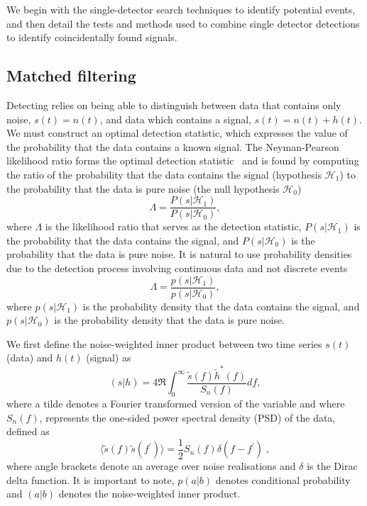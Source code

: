 We begin with the single-detector search techniques to identify potential \gwadj events, and then detail the tests and methods used to combine single detector detections to identify coincidentally found \gwadj signals.

\subsection{\label{2:sec:matched-filter}Matched filtering}

Detecting \gws relies on being able to distinguish between data that contains only noise, \( s(t) = n(t) \), and data which contains a \gwadj signal, \( s(t) = n(t) + h(t) \). We must construct an optimal detection statistic, which expresses the value of the probability that the data contains a known signal. The Neyman-Pearson likelihood ratio forms the optimal detection statistic~\cite{Biswas:2012} and is found by computing the ratio of the probability that the data contains the signal (hypothesis $\mathcal{H}_{1}$) to the probability that the data is pure noise (the null hypothesis $\mathcal{H}_{0}$)
%
\begin{equation}
    \Lambda = \frac{P(s|\mathcal{H}_{1})}{P(s|\mathcal{H}_{0})},
\end{equation}
%
where \( \Lambda \) is the likelihood ratio that serves as the detection statistic, \( P(s|\mathcal{H}_{1}) \) is the probability that the data contains the signal, and \( P(s|\mathcal{H}_{0}) \) is the probability that the data is pure noise. It is natural to use probability densities due to the detection process involving continuous data and not discrete events
%
\begin{equation}
    \Lambda = \frac{p(s|\mathcal{H}_{1})}{p(s|\mathcal{H}_{0})},
    \label{2:eq:likelihood_ratio}
\end{equation}
%
where \( p(s|\mathcal{H}_{1}) \) is the probability density that the data contains the signal, and \( p(s|\mathcal{H}_{0}) \) is the probability density that the data is pure noise.

We first define the noise-weighted inner product between two time series $s(t)$ (data) and $h(t)$ (signal) as~\cite{PyCBC:2016}
%
\begin{equation}
  (s | h) = 4 \Re \int^{\infty}_{0} \frac{\tilde{s}(f) \tilde{h}^*(f)}{S_n(f)} df,
  \label{2:eqn:inner_product}
\end{equation}
%
where a tilde denotes a Fourier transformed version of the variable and where $S_n(f)$, represents the one-sided power spectral density (PSD) of the data, defined as
%
\begin{equation}
  \langle \tilde{s}(f) \tilde{s}(f^\prime) \rangle = \frac{1}{2} S_n(f) \delta(f - f^\prime) \;,
  \label{2:eqn:psd}
\end{equation}
%
where angle brackets denote an average over noise realisations and $\delta$ is the Dirac delta function. It is important to note, $p(a|b)$ denotes conditional probability and $(a|b)$ denotes the noise-weighted inner product.

